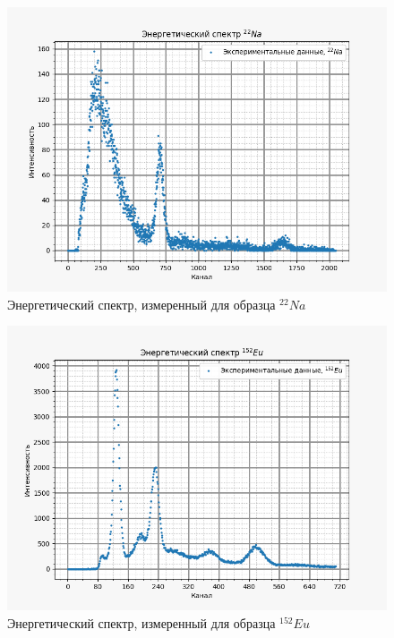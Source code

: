     \begin{figure}[H]
        \centering
        \includegraphics[width = 12 cm]{images/Na22}
        \caption{Энергетический спектр, измеренный для образца $^{22}Na$}
        \label{Na22_pic}
    \end{figure}

    \begin{figure}[H]
        \centering
        \includegraphics[width = 12 cm]{images/Eu152}
        \caption{Энергетический спектр, измеренный для образца $^{152}Eu$}
        \label{Eu152_pic}
    \end{figure}

